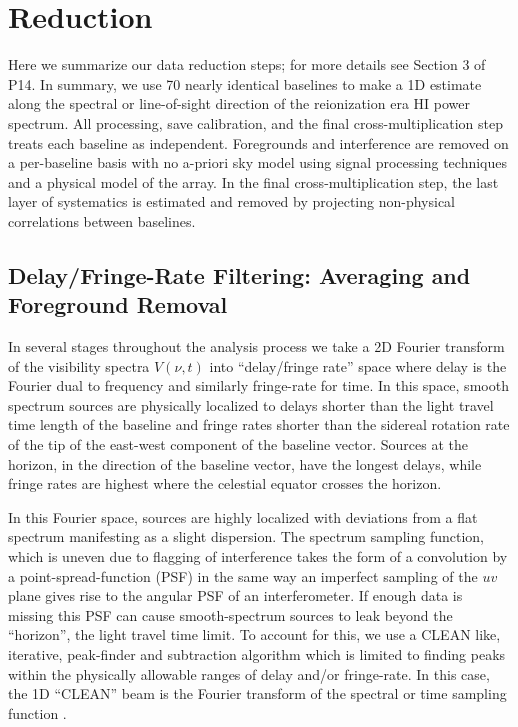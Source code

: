 \documentclass[preprint2]{aastex}
\begin{document}
\section{Reduction}
\label{sec:obs_meth}
Here we summarize our data reduction steps; for more details see Section 3 of P14.  In summary, we use 70 nearly identical baselines to make a 1D estimate along the spectral or line-of-sight direction of the reionization era HI power spectrum.  All processing, save calibration, and  the final cross-multiplication step treats each baseline as independent. Foregrounds and interference are removed on a per-baseline basis with no a-priori sky model using signal processing techniques and a physical model of the array. In the final cross-multiplication step, the last layer of systematics is estimated and removed by projecting non-physical correlations between baselines.
\subsection{Delay/Fringe-Rate Filtering: Averaging and Foreground Removal}
\label{sec:transforms}
In several stages throughout the analysis process we take a 2D Fourier transform of the visibility spectra $V(\nu,t)$ into ``delay/fringe rate'' space where delay is the Fourier dual to frequency and similarly fringe-rate for time.  In this space, smooth spectrum sources are physically localized to delays shorter than the light travel time length of the baseline and fringe rates shorter than the sidereal rotation rate of the tip of the east-west component of the baseline vector. Sources at the horizon, in the direction of the baseline vector, have the longest delays, while fringe rates are highest where the celestial equator crosses the horizon. 


 In this Fourier space, sources are highly localized with deviations from a flat spectrum manifesting as a slight dispersion. The spectrum sampling function, which is uneven due to flagging of interference takes the form of a convolution by a point-spread-function (PSF) in the same way an imperfect sampling of the $uv$ plane gives rise to the angular PSF of an interferometer.  If enough data is missing this PSF can cause smooth-spectrum sources to leak beyond the ``horizon'', the light travel time limit.  To account for this, we use a CLEAN like, iterative, peak-finder and subtraction algorithm which is limited to finding peaks within the physically allowable ranges of delay and/or fringe-rate. In this case, the 1D ``CLEAN'' beam is the Fourier transform of the spectral or time sampling function \citep{Parsons:2009p7859}.
\end{document}
